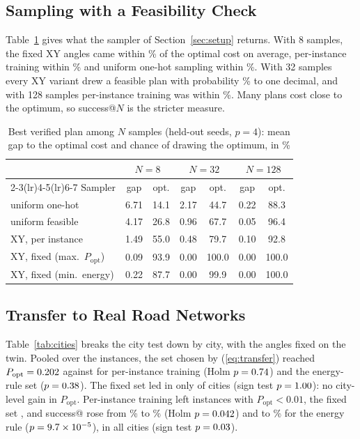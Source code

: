 \documentclass[conference]{IEEEtran}
\begin{document}
\subsection{Sampling with a Feasibility Check}
Table~\ref{tab:gap} gives what the sampler of Section~\ref{sec:setup} returns. With 8 samples, the fixed XY angles came within \GapFxEight\% of the optimal cost on average, per-instance training within \GapTrEight\% and uniform one-hot sampling within \GapUniEight\%. With 32 samples every XY variant drew a feasible plan with probability \PfeasThirtyTwoMin\% to one decimal, and with 128 samples per-instance training was within \GapTrBig\%. Many plans cost close to the optimum, so success@$N$ is the stricter measure.

\begin{table}[t]
\caption{Best verified plan among $N$ samples (held-out seeds, $p=4$): mean gap to the optimal cost and chance of drawing the optimum, in \%}
\label{tab:gap}
\centering
\footnotesize
\setlength{\tabcolsep}{2.2pt}
\begin{tabular}{lcccccc}
\toprule
 & \multicolumn{2}{c}{$N=8$} & \multicolumn{2}{c}{$N=32$} & \multicolumn{2}{c}{$N=128$}\\
\cmidrule(lr){2-3}\cmidrule(lr){4-5}\cmidrule(lr){6-7}
Sampler & gap & opt. & gap & opt. & gap & opt.\\
\midrule
uniform one-hot & 6.71 & 14.1 & 2.17 & 44.7 & 0.22 & 88.3\\
uniform feasible & 4.17 & 26.8 & 0.96 & 67.7 & 0.05 & 96.4\\
XY, per instance & 1.49 & 55.0 & 0.48 & 79.7 & 0.10 & 92.8\\
XY, fixed (max.\ $P_{\mathrm{opt}}$) & 0.09 & 93.9 & 0.00 & 100.0 & 0.00 & 100.0\\
XY, fixed (min.\ energy) & 0.22 & 87.7 & 0.00 & 99.9 & 0.00 & 100.0\\
\bottomrule
\end{tabular}
\end{table}

\subsection{Transfer to Real Road Networks}
Table~\ref{tab:cities} breaks the city test down by city, with the angles fixed on the twin. Pooled over the \CityN{} instances, the set chosen by (\ref{eq:transfer}) reached $P_{\mathrm{opt}}=0.202$ against \CityTrained{} for per-instance training (Holm $p=0.74$) and the energy-rule set \CityEnFixed{} ($p=0.38$). The fixed set led in only \CityPos{} of \CityK{} cities (sign test $p=1.00$): no city-level gain in $P_{\mathrm{opt}}$. Per-instance training left \CityTrainedLow{} instances with $P_{\mathrm{opt}}<0.01$, the fixed set \CityFixedLow, and success@\Shots{} rose from \CitySuccTrained\% to \CitySuccFixed\% (Holm $p=0.042$) and to \CityEnSucc\% for the energy rule ($p=9.7\times10^{-5}$), in all \CitySuccPos{} cities (sign test $p=0.03$).
\end{document}
